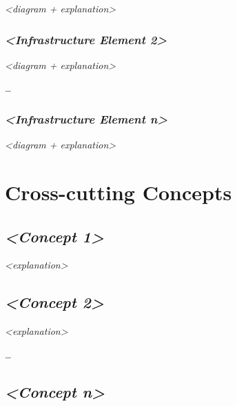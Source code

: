 \documentclass[
]{article}
\begin{document}
\emph{\textless diagram + explanation\textgreater{}}

\hypertarget{__emphasis_infrastructure_element_2_emphasis}{%
\subsubsection{\texorpdfstring{\emph{\textless Infrastructure Element
2\textgreater{}}}{\textless Infrastructure Element 2\textgreater{}}}\label{__emphasis_infrastructure_element_2_emphasis}}

\emph{\textless diagram + explanation\textgreater{}}

\ldots{}

\hypertarget{__emphasis_infrastructure_element_n_emphasis}{%
\subsubsection{\texorpdfstring{\emph{\textless Infrastructure Element
n\textgreater{}}}{\textless Infrastructure Element n\textgreater{}}}\label{__emphasis_infrastructure_element_n_emphasis}}

\emph{\textless diagram + explanation\textgreater{}}

\hypertarget{section-concepts}{%
\section{Cross-cutting Concepts}\label{section-concepts}}

\hypertarget{__emphasis_concept_1_emphasis}{%
\subsection{\texorpdfstring{\emph{\textless Concept
1\textgreater{}}}{\textless Concept 1\textgreater{}}}\label{__emphasis_concept_1_emphasis}}

\emph{\textless explanation\textgreater{}}

\hypertarget{__emphasis_concept_2_emphasis}{%
\subsection{\texorpdfstring{\emph{\textless Concept
2\textgreater{}}}{\textless Concept 2\textgreater{}}}\label{__emphasis_concept_2_emphasis}}

\emph{\textless explanation\textgreater{}}

\ldots{}

\hypertarget{__emphasis_concept_n_emphasis}{%
\subsection{\texorpdfstring{\emph{\textless Concept
n\textgreater{}}}{\textless Concept n\textgreater{}}}\label{__emphasis_concept_n_emphasis}}
\end{document}
